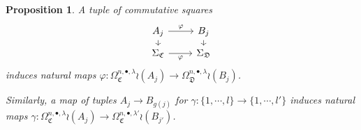 \documentclass[a4paper,10pt
]{article}%
\numberwithin{equation}{section}
\numberwithin{figure}{section}
\newtheorem{proposition}[equation]{Proposition}%
\theoremstyle{definition} %
\newcommand{\1}{\ensuremath{\mathbbm 1}}%
\begin{document}
\begin{proposition}\label{SPANPIECEJ PROP}
	A tuple of commutative squares
	\begin{equation}\label{SPANPIECEJ EQ}
	\begin{tikzcd}[row sep = 6pt]
	A_j \ar{d} \ar{r}{\varphi} &  \ar{d} B_j
	\\
	\Sigma_{\mathfrak{C}} \ar{r}[swap]{\varphi} & \Sigma_{\mathfrak{D}}
	\end{tikzcd}
	\end{equation}
	induces natural maps 
	$\varphi \colon
	\Omega_{\mathfrak{C}}^{n,\bullet,\lambda} \wr (A_j) \to 
	\Omega_{\mathfrak{D}}^{n,\bullet,\lambda} \wr (B_j) $.
	
	Similarly, a map of tuples $A_j \to B_{g(j)}$ for 
	$\gamma \colon \{1,\cdots,l\} \to \{1,\cdots,l'\}$
	induces natural maps 
	$\gamma \colon
	\Omega_{\mathfrak{C}}^{n,\bullet,\lambda} \wr (A_j) \to 
	\Omega_{\mathfrak{C}}^{n,\bullet,\lambda'} \wr (B_{j'}) $.
	

\end{proposition}
\end{document}

